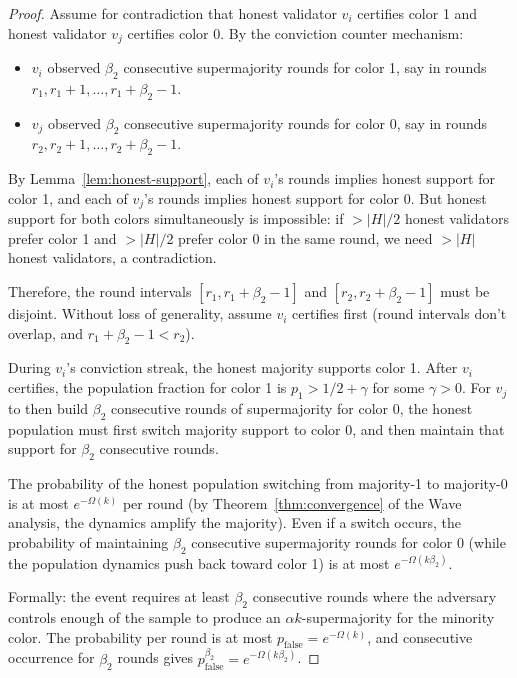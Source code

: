 \begin{proof}
Assume for contradiction that honest validator $v_i$ certifies color 1 and honest
validator $v_j$ certifies color 0. By the conviction counter mechanism:
\begin{itemize}[nosep]
\item $v_i$ observed $\beta_2$ consecutive supermajority rounds for color 1, say in
rounds $r_1, r_1+1, \ldots, r_1+\beta_2-1$.
\item $v_j$ observed $\beta_2$ consecutive supermajority rounds for color 0, say in
rounds $r_2, r_2+1, \ldots, r_2+\beta_2-1$.
\end{itemize}

By Lemma~\ref{lem:honest-support}, each of $v_i$'s rounds implies honest support for
color 1, and each of $v_j$'s rounds implies honest support for color 0. But honest
support for both colors simultaneously is impossible: if $> |H|/2$ honest validators
prefer color 1 and $> |H|/2$ prefer color 0 in the same round, we need $> |H|$ honest
validators, a contradiction.

Therefore, the round intervals $[r_1, r_1+\beta_2-1]$ and $[r_2, r_2+\beta_2-1]$ must
be disjoint. Without loss of generality, assume $v_i$ certifies first (round intervals
don't overlap, and $r_1 + \beta_2 - 1 < r_2$).

During $v_i$'s conviction streak, the honest majority supports color 1. After $v_i$
certifies, the population fraction for color 1 is $p_1 > 1/2 + \gamma$ for some
$\gamma > 0$. For $v_j$ to then build $\beta_2$ consecutive rounds of supermajority
for color 0, the honest population must first switch majority support to color 0, and
then maintain that support for $\beta_2$ consecutive rounds.

The probability of the honest population switching from majority-1 to majority-0 is
at most $e^{-\Omega(k)}$ per round (by Theorem~\ref{thm:convergence} of the Wave
analysis, the dynamics amplify the majority). Even if a switch occurs, the probability
of maintaining $\beta_2$ consecutive supermajority rounds for color 0 (while the
population dynamics push back toward color 1) is at most $e^{-\Omega(k\beta_2)}$.

Formally: the event requires at least $\beta_2$ consecutive rounds where the adversary
controls enough of the sample to produce an $\alpha k$-supermajority for the minority
color. The probability per round is at most $p_{\text{false}} = e^{-\Omega(k)}$, and
consecutive occurrence for $\beta_2$ rounds gives $p_{\text{false}}^{\beta_2} = e^{-\Omega(k\beta_2)}$.
\end{proof}

